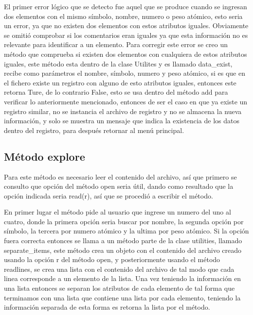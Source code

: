 \documentclass[conference]{IEEEtran}
\begin{document}
El primer error lógico que se detecto fue aquel que se produce cuando se ingresan dos elementos con el mismo símbolo, nombre, numero o peso atómico, esto seria un error, ya que no existen dos elementos con estos atributos iguales. Obviamente se omitió comprobar si los comentarios eran iguales ya que esta información no es relevante para identificar a un elemento. Para corregir este error se creo un método que comprueba si existen dos elementos con cualquiera de estos atributos iguales, este método esta dentro de la clase Utilites y es llamado data\_exist, recibe como parámetros el nombre, símbolo, numero y peso atómico, si es que en el fichero existe un registro con alguno de esto atributos iguales, entonces este retorna Ture, de lo contrario False, esto se usa dentro del método add para verificar lo anteriormente mencionado, entonces de ser el caso en que ya existe un registro similar, no se instancia el archivo de registro y no se almacena la nueva información, y solo se muestra un mensaje que indica la existencia de los datos dentro del registro, para después retornar al menú principal. 

\subsection{Método explore}
Para este método es necesario leer el contenido del archivo, así que primero se consulto que opción del método open seria útil, dando como resultado que la opción indicada seria read(r), así que se procedió a escribir el método.\par 
En primer lugar el método pide al usuario que ingrese un numero del uno al cuatro, donde la primera opción seria buscar por nombre, la segunda opción por símbolo, la tercera por numero atómico y la ultima por peso atómico. Si la opción fuera correcta entonces se llama a un método parte de la clase utilities, llamado separate\_items, este método crea un objeto con el contenido del archivo creado usando la opción r del método open, y posteriormente usando el método readlines, se crea una lista con el contenido del archivo de tal modo que cada linea corresponde a un elemento de la lista. Una vez teniendo la información en una lista entonces se separan los atributos de cada elemento de tal forma que terminamos con una lista que contiene una lista por cada elemento, teniendo la información separada de esta forma es retorna la lista por el método. 
\end{document}
